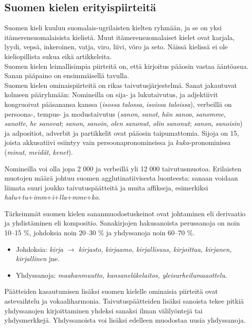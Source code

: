 \begin{multicols}{2}
\subsection{Suomen kielen erityispiirteitä}

Suomen kieli kuuluu suomalais-ugrilaisten kielten ryhmään, ja se on yksi
itämerensuomalaisista kielistä. Muut itämerensuomalaiset kielet ovat karjala,
lyydi, vepsä, inkeroinen, vatja, viro, liivi, võro ja seto. Näissä kielissä ei
ole kieliopillista sukua eikä artikkeleita.\\
Suomen kielen leimallisimpia piirteitä on, että kirjoitus pääosin vastaa
ääntöasua. Sanan pääpaino on ensimmäisellä tavulla.\\
Suomen kielen ominaispiirteitä on rikas taivutusjärjestelmä. Sanat jakautuvat
kolmeen pääryhmään: Nomineilla on sija- ja lukutaivutus, ja adjektiivit
kongruoivat pääsanansa kanssa (\textit{isossa talossa}, \textit{isoissa taloissa}), verbeillä on
persoona-, tempus- ja modustaivutus (\textit{sanon}, \textit{sanot}, \textit{hän sanoo}, \textit{sanomme}, \textit{sanotte},
\textit{he sanovat}; \textit{sanon}, \textit{sanoin}, \textit{olen sanonut}, \textit{olin sanonut}; \textit{sanon}, \textit{sanoisin}) ja
adpositiot, adverbit ja partikkelit ovat pääosin taipumattomia. Sijoja on 15,
joista akkusatiivi esiintyy vain persoonapronomineissa ja \textit{kuka}-pronominissa (\textit{minut}, \textit{meidät}, \textit{kenet}).

Nomineilla voi olla jopa 2 000 ja verbeillä yli 12 000 taivutusmuotoa.
Erilaisten muotojen määrä johtuu suomen agglutinatiivisesta luonteesta: sanaan
voidaan liimata suuri joukko taivutuspäätteitä ja muita affikseja, esimerkiksi
\textit{halu}+\textit{tu}+\textit{imm}+\textit{i}+\textit{lla}+\textit{mme}+\textit{ko}.

Tärkeimmät suomen kielen sananmuodostuskeinot ovat johtaminen eli derivaatio ja
yhdistäminen eli kompositio. Sanakirjojen hakusanoista perussanoja on noin
10–15 \%, johdoksia noin 20–30 \% ja yhdyssanoja noin 60–70 \%.
\begin{itemize}
\item Johdoksia: \textit{kirja $\to$ kirjasto, kirjaamo, kirjallisuus, kirjoittaa, kirjanen,
    kirjallinen} jne.

\item Yhdyssanoja: \textit{maahanmuutto, kansaneläkelaitos, yleisurheilumaaottelu.}
\end{itemize}
Päätteiden kasautumisen lisäksi suomen kielelle ominaisia piirteitä ovat
astevaihtelu ja vokaaliharmonia. Taivutuspäätteiden lisäksi sanoista tekee
pitkiä yhdyssanojen kirjoittaminen yhdeksi sanaksi ilman välilyöntejä tai
yhdysmerkkejä. Yhdyssanoista voi lisäksi edelleen muodostaa uusia yhdyssanoja.


\end{multicols}
